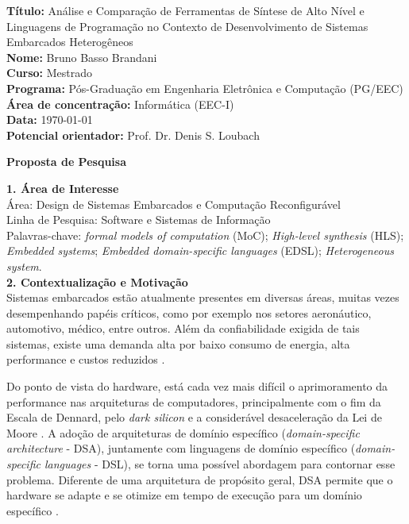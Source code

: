 \noindent
\textbf{Título:} Análise e Comparação de Ferramentas de Síntese de Alto Nível e
Linguagens de Programação no Contexto de Desenvolvimento de Sistemas Embarcados
Heterogêneos\\
\textbf{Nome:} Bruno Basso Brandani \\
\textbf{Curso:} Mestrado \\
\textbf{Programa:} Pós-Graduação em Engenharia Eletrônica e Computação (PG/EEC) \\
\textbf{Área de concentração:} Informática (EEC-I) \\
\textbf{Data:} \today \\
\textbf{Potencial orientador:} Prof. Dr. Denis S. Loubach \\

\centerline{\textbf{Proposta de Pesquisa}}
\centerline{}

\noindent
\textbf{1. Área de Interesse}\\
\noindent
Área: Design de Sistemas Embarcados e Computação Reconfigurável\\
Linha de Pesquisa: Software e Sistemas de Informação\\
Palavras-chave: \emph{formal models of computation} (MoC); \emph{High-level synthesis} (HLS); \emph{Embedded systems}; \emph{Embedded domain-specific languages} (EDSL); \emph{Heterogeneous system}.\\

\noindent
\textbf{2. Contextualização e Motivação}\\
Sistemas embarcados estão atualmente presentes em diversas áreas, muitas vezes desempenhando papéis críticos, como por exemplo nos setores aeronáutico, automotivo, médico, entre outros. Além da confiabilidade exigida de tais sistemas, existe uma demanda alta por baixo consumo de energia, alta performance e custos reduzidos \cite{Horita}.

Do ponto de vista do hardware, está cada vez mais difícil o aprimoramento da
performance nas arquiteturas de computadores, principalmente com o fim da Escala
de Dennard, pelo \emph{dark silicon} e a considerável desaceleração da Lei de
Moore \cite{Loubach2022a}. A adoção de arquiteturas de domínio específico
(\emph{domain-specific architecture} - DSA), juntamente com linguagens de
domínio específico (\emph{domain-specific languages} - DSL), se torna uma
possível abordagem para contornar esse problema. Diferente de uma arquitetura de
propósito geral, DSA permite que o hardware se adapte e se otimize em tempo de
execução para um domínio específico \cite{Loubach2019a}.

